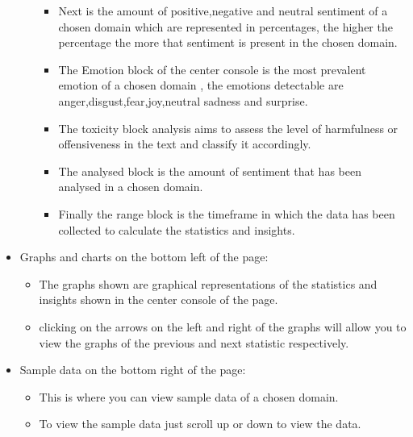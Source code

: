 \documentclass[12pt]{article}
\begin{document}
\begin{itemize}
\begin{itemize}
\begin{itemize}
            \item Next is the amount of positive,negative and neutral sentiment of a chosen domain which are represented in percentages, the higher the percentage the more that sentiment is present in the chosen domain.
            \item The Emotion block of the center console is the most prevalent emotion of a chosen domain , the emotions detectable are anger,disgust,fear,joy,neutral sadness and surprise.
            \item The toxicity block analysis aims to assess the level of harmfulness or offensiveness in the text and classify it accordingly.
            \item The analysed block is the amount of sentiment that has been analysed in a chosen domain.
            \item Finally the range block is the timeframe in which the data has been collected to calculate the statistics and insights.
        \end{itemize}
    \end{itemize}
    \item Graphs and charts on the bottom left of the page:
    \begin{itemize}
        \item The graphs shown are graphical representations of the statistics and insights shown in the center console of the page.
        \item clicking on the arrows on the left and right of the graphs will allow you to view the graphs of the previous and next statistic respectively.
    \end{itemize}
    \item Sample data on the bottom right of the page:
    \begin{itemize}
        \item This is where you can view sample data of a chosen domain.
        \item To view the sample data just scroll up or down to view the data.
    \end{itemize}
\end{itemize}
\end{document}
